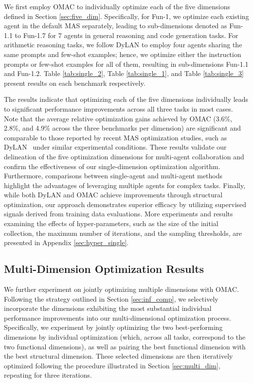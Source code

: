 We first employ OMAC to individually optimize each of the five dimensions defined in Section \ref{sec:five_dim}. Specifically, for Fun-1, we optimize each existing agent in the default MAS separately, leading to sub-dimensions denoted as Fun-1.1 to Fun-1.7 for 7 agents in general reasoning and code generation tasks. For arithmetic reasoning tasks, we follow DyLAN to employ four agents sharing the same prompts and few-shot examples; hence, we optimize either the instruction prompts or few-shot examples for all of them, resulting in sub-dimensions Fun-1.1 and Fun-1.2. Table \ref{tab:single_2}, Table \ref{tab:single_1}, and Table \ref{tab:single_3} present results on each benchmark respectively.

The results indicate that optimizing each of the five dimensions individually leads to significant performance improvements across all three tasks in most cases. 
Note that the average relative optimization gains achieved by OMAC (3.6\%, 2.8\%, and 4.9\% across the three benchmarks per dimension) are significant and comparable to those reported by recent MAS optimization studies, such as DyLAN~\cite{dylan} under similar experimental conditions.
These results validate our delineation of the five optimization dimensions for multi-agent collaboration and confirm the effectiveness of our single-dimension optimization algorithm. Furthermore, comparisons between single-agent and multi-agent methods highlight the advantages of leveraging multiple agents for complex tasks. Finally, while both DyLAN and OMAC achieve improvements through structural optimization, our approach demonstrates superior efficacy by utilizing supervised signals derived from training data evaluations. More experiments and results examining the effects of hyper-parameters, such as the size of the initial collection, the maximum number of iterations, and the sampling thresholds, are presented in Appendix \ref{sec:hyper_single}.






\subsection{Multi-Dimension Optimization Results}\label{sec:multi_results}


We further experiment on jointly optimizing multiple dimensions with OMAC. Following the strategy outlined in Section \ref{sec:inf_comp}, we selectively incorporate the dimensions exhibiting the most substantial individual performance improvements into our multi-dimensional optimization process. Specifically, we experiment by jointly optimizing the two best-performing dimensions by individual optimization (which, across all tasks, correspond to the two functional dimensions), as well as pairing the best functional dimension with the best structural dimension. These selected dimensions are then iteratively optimized following the procedure illustrated in Section \ref{sec:multi_dim}, repeating for three iterations.


